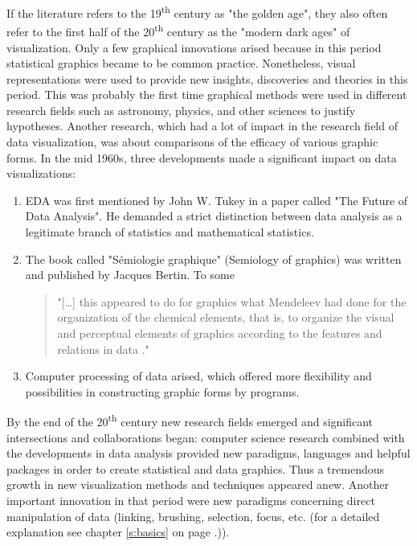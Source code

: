 If the literature refers to the 19\textsuperscript{th} century as "the golden age", they also often refer to the first half of the 20\textsuperscript{th} century as the "modern dark ages" of visualization. Only a few graphical innovations arised because in this period statistical graphics became to be common practice. Nonetheless, visual representations were used to provide new insights, discoveries and theories in this period. This was probably the first time graphical methods were used in different research fields such as astronomy, physics, and other sciences to justify hypotheses. Another research, which had a lot of impact in the research field of data visualization, was about comparisons of the efficacy of various graphic forms. In the mid 1960s, three developments made a significant impact on data visualizations:
\begin{enumerate}
\item \ac{EDA} was first mentioned by John W. Tukey in a paper called "The Future of Data Analysis". He demanded a strict distinction between data analysis as a legitimate branch of statistics and mathematical statistics.
\item The book called "Sémiologie graphique" (Semiology of graphics) was written and published by Jacques Bertin. To some
\begin{quote}
"[\ldots] this appeared to do for graphics what Mendeleev had done for the organization of the chemical elements, that is, to organize the visual and perceptual elements of graphics according to the features and relations in data ."
\end{quote}
\label{crossref:bertain}
\item Computer processing of data arised, which offered more flexibility and possibilities in constructing graphic forms by programs.
\end{enumerate}

By the end of the 20\textsuperscript{th} century new research fields emerged and significant intersections and collaborations began: computer science research combined with the developments in data analysis provided new paradigms, languages and helpful packages in order to create statistical and data graphics. Thus a tremendous growth in new visualization methods and techniques appeared anew.
Another important innovation in that period were new paradigms  concerning direct manipulation of data (linking, brushing, selection, focus, etc. (for a detailed explanation see chapter \ref{s:basics} on page \pageref{s:basics}.)).